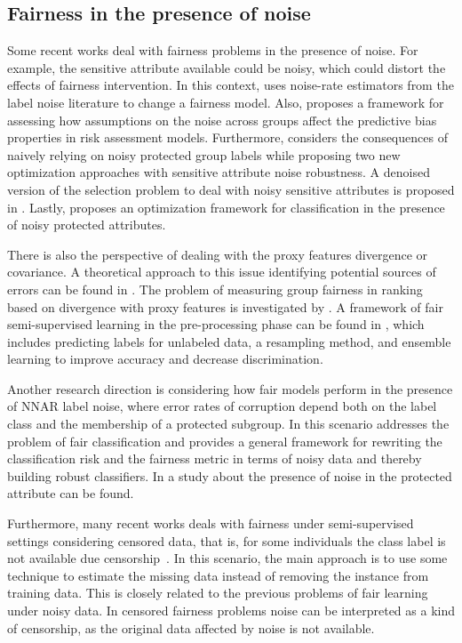 \subsection{Fairness in the presence of noise}\label{sec:fairness_noise}

Some recent works deal with fairness problems in the presence of noise. For example, the sensitive attribute available could be noisy, which could distort the effects of fairness intervention. In this context, \cite{Lamy2019} uses noise-rate estimators from the label noise literature to change a fairness model. Also, \cite{Fogliato2020} proposes a framework for assessing how assumptions on the noise across groups affect the predictive bias properties in risk assessment models. Furthermore, \cite{Wang2020} considers the consequences of naively relying on noisy protected group labels while proposing two new optimization approaches with sensitive attribute noise robustness. A denoised version of the selection problem to deal with noisy sensitive attributes is proposed in \cite{Mehrotra2021}. Lastly, \cite{Celis2021} proposes an optimization framework for classification in the presence of noisy protected attributes.

There is also the perspective of dealing with the proxy features divergence or covariance. A theoretical approach to this issue identifying potential sources of errors can be found in \cite{Prost2021}. The problem of measuring group fairness in ranking based on divergence with proxy features is investigated by \cite{Ghazimatin2022}. A framework of fair semi-supervised learning in the pre-processing phase can be found in \cite{Zhang2022}, which includes predicting labels for unlabeled data, a resampling method, and ensemble learning to improve accuracy and decrease discrimination.

Another research direction is considering how fair models perform in the presence of NNAR label noise, where error rates of corruption depend both on the label class and the membership of a protected subgroup. In this scenario \cite{Wang2021} addresses the problem of fair classification and \cite{Wu2022} provides a general framework for rewriting the classification risk and the fairness metric in terms of noisy data and thereby building robust classifiers. In \cite{Ghosh2023} a study about the presence of noise in the protected attribute can be found.

Furthermore, many recent works deals with fairness under semi-supervised settings considering censored data, that is, for some individuals the class label is not available due censorship~\cite{WZhang2022,WZhang2023_a,WZhang2023_b,WZhang2023_c}. In this scenario, the main approach is to use some technique to estimate the missing data instead of removing the instance from training data. This is closely related to the previous problems of fair learning under noisy data. In censored fairness problems noise can be interpreted as a kind of censorship, as the original data affected by noise is not available.

